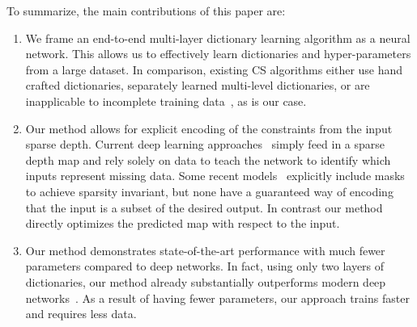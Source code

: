 
To summarize, the main contributions of this paper are:
\begin{enumerate}
\item We frame an end-to-end multi-layer dictionary learning algorithm as a neural network. This allows us to effectively learn dictionaries and hyper-parameters from a large dataset. In comparison, existing CS algorithms either use hand crafted dictionaries, separately learned multi-level dictionaries, or are inapplicable to incomplete training data~\cite{}, as is our case.

  
\item Our method allows for explicit encoding of the constraints from the input sparse depth. Current deep learning approaches~\cite{} simply feed in a sparse depth map and rely solely on data to teach the network to identify which inputs represent missing data. Some recent models~\cite{} explicitly include masks to achieve sparsity invariant, but none have a guaranteed way of encoding that the input is a subset of the desired output. In contrast our method directly optimizes the predicted map with respect to the input.
  
  
\item Our method demonstrates state-of-the-art performance with much fewer parameters compared to deep networks. In fact, using only two layers of dictionaries, our method already substantially outperforms modern deep networks~\cite{}. As a result of having fewer parameters, our approach trains faster and requires less data.
  
\end{enumerate}
  